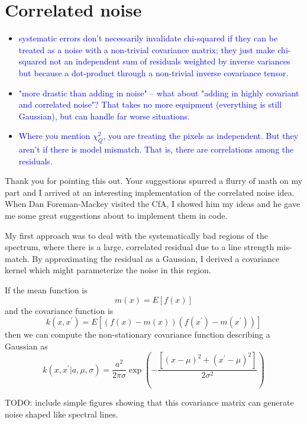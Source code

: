 \documentclass[preprint]{aastex} %
\newcommand{\hcom}[1]{ \textcolor{Blue}{#1}}
\begin{document}
\section{Correlated noise}
\begin{itemize}
  \item \hcom{systematic errors don't necessarily invalidate chi-squared if they can be treated as a noise with a non-trivial covariance matrix; they just make chi-squared not an independent sum of residuals weighted by inverse variances but because a dot-product through a non-trivial inverse covariance tensor.}
  \item \hcom{"more drastic than adding in noise" -- what about "adding in highly covariant and correlated noise"? That takes no more equipment (everything is still Gaussian), but can handle far worse situations.}
  \item \hcom{Where you mention $\chi^2_Q$, you are treating the pixels as independent. But they aren't if there is model mismatch. That is, there are correlations among the residuals.}
\end{itemize}

Thank you for pointing this out. Your suggestions spurred a flurry of math on my part and I arrived at an interesting implementation of the correlated noise idea. When Dan Foreman-Mackey visited the CfA, I showed him my ideas and he gave me some great suggestions about to implement them in code.  

My first approach was to deal with the systematically bad regions of the spectrum, where there is a large, correlated residual due to a line strength mis-match. By approximating the residual as a Gaussian, I derived a covariance kernel which might parameterize the noise in this region.

If the mean function is
\begin{equation}
m(x) = E[f(x)]
\end{equation}
and the covariance function is
\begin{equation}
k(x, x^\prime) = E[(f(x) - m(x))(f(x^\prime) - m(x^\prime))]
\end{equation}
then we can compute the non-stationary covariance function describing a Gaussian as
\begin{equation}
k(x, x^\prime | a, \mu, \sigma) = \frac{a^2}{2 \pi \sigma} \exp \left ( - \frac{[(x - \mu)^2 + (x^\prime - \mu)^2]}{2 \sigma^2}\right )
\end{equation}


TODO: include simple figures showing that this covariance matrix can generate noise shaped like spectral lines. 
\end{document}
